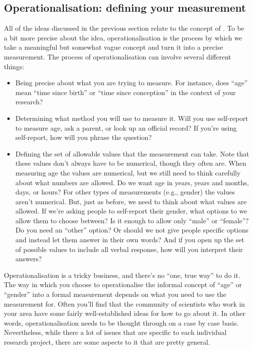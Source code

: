 \subsection{Operationalisation: defining your measurement}

All of the ideas discussed in the previous section relate to the concept of . To be a bit more precise about the idea, operationalisation is the process by which we take a meaningful but somewhat vague concept and turn it into a precise measurement. The process of operationalisation can involve several different things:

\begin{itemize}
\item Being precise about what you are trying to measure. For instance, does ``age'' mean ``time since birth'' or ``time since conception'' in the context of your research?
\item Determining what method you will use to measure it. Will you use self-report to measure age, ask a parent, or look up an official record? If you're using self-report, how will you phrase the question? 
\item Defining the set of allowable values that the measurement can take. Note that these values don't always have to be numerical, though they often are. When measuring age the values are numerical, but we still need to think carefully about what numbers are allowed. Do we want age in years, years and months, days, or hours? For other types of measurements (e.g., gender) the values aren't numerical. But, just as before, we need to think about what values are allowed. If we're asking people to self-report their gender, what options to we allow them to choose between? Is it enough to allow only ``male'' or ``female''? Do you need an ``other'' option? Or should we not give people specific options and instead let them answer in their own words? And if you open up the set of possible values to include all verbal response, how will you interpret their answers?
\end{itemize}
 
Operationalisation is a tricky business, and there's no ``one, true way'' to do it. The way in which you choose to operationalise the informal concept of ``age'' or ``gender'' into a formal measurement depends on what you need to use the measurement for. Often you'll find that the community of scientists who work in your area have some fairly well-established ideas for how to go about it. In other words, operationalisation needs to be thought through on a case by case basis. Nevertheless, while there a lot of issues that are specific to each individual research project, there are some aspects to it that are pretty general. 

